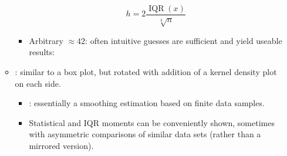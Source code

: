 \begin{itemize}
\begin{itemize}
\begin{itemize}
        \[%
        h = 2\frac{\operatorname{IQR}(x)}{\sqrt[3]{n}}
        \]%
        \item Arbitrary \(\approx42\): often intuitive guesses are sufficient and yield useable results:
      \end{itemize}
    \item {}: similar to a box plot, but rotated with addition of a kernel density plot on each side. 
      \begin{itemize}
        \item {}: essentially a smoothing estimation based on finite data samples.
        \item Statistical and IQR moments can be conveniently shown, sometimes with asymmetric comparisons of similar data sets (rather than a mirrored version).
      \end{itemize}
  \end{itemize}
  
\end{itemize}

